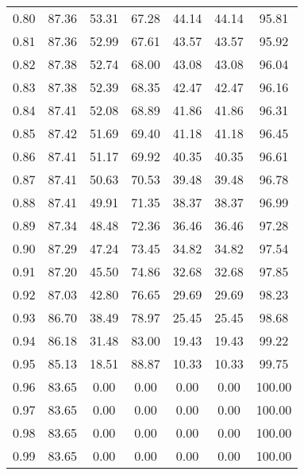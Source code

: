 \begin{tabular}{|c|c|c|c|c|c|c|}
      0.80 &     87.36 &     53.31 &      67.28 &   44.14 &      44.14 &         95.81 \\
      0.81 &     87.36 &     52.99 &      67.61 &   43.57 &      43.57 &         95.92 \\
      0.82 &     87.38 &     52.74 &      68.00 &   43.08 &      43.08 &         96.04 \\
      0.83 &     87.38 &     52.39 &      68.35 &   42.47 &      42.47 &         96.16 \\
      0.84 &     87.41 &     52.08 &      68.89 &   41.86 &      41.86 &         96.31 \\
      0.85 &     87.42 &     51.69 &      69.40 &   41.18 &      41.18 &         96.45 \\
      0.86 &     87.41 &     51.17 &      69.92 &   40.35 &      40.35 &         96.61 \\
      0.87 &     87.41 &     50.63 &      70.53 &   39.48 &      39.48 &         96.78 \\
      0.88 &     87.41 &     49.91 &      71.35 &   38.37 &      38.37 &         96.99 \\
      0.89 &     87.34 &     48.48 &      72.36 &   36.46 &      36.46 &         97.28 \\
      0.90 &     87.29 &     47.24 &      73.45 &   34.82 &      34.82 &         97.54 \\
      0.91 &     87.20 &     45.50 &      74.86 &   32.68 &      32.68 &         97.85 \\
      0.92 &     87.03 &     42.80 &      76.65 &   29.69 &      29.69 &         98.23 \\
      0.93 &     86.70 &     38.49 &      78.97 &   25.45 &      25.45 &         98.68 \\
      0.94 &     86.18 &     31.48 &      83.00 &   19.43 &      19.43 &         99.22 \\
      0.95 &     85.13 &     18.51 &      88.87 &   10.33 &      10.33 &         99.75 \\
      0.96 &     83.65 &      0.00 &       0.00 &    0.00 &       0.00 &        100.00 \\
      0.97 &     83.65 &      0.00 &       0.00 &    0.00 &       0.00 &        100.00 \\
      0.98 &     83.65 &      0.00 &       0.00 &    0.00 &       0.00 &        100.00 \\
      0.99 &     83.65 &      0.00 &       0.00 &    0.00 &       0.00 &        100.00 \\
\bottomrule
\end{tabular}
